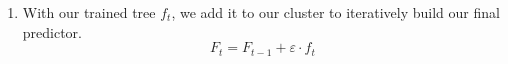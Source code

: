 \begin{definition}
\begin{enumerate}
\begin{enumerate}
          \item With our trained tree $f_t$, we add it to our cluster to iteratively build our final predictor. 
            \begin{equation}
              F_t = F_{t-1} + \varepsilon \cdot f_t
            \end{equation}

        \end{enumerate}
    \end{enumerate}
  \end{definition}

